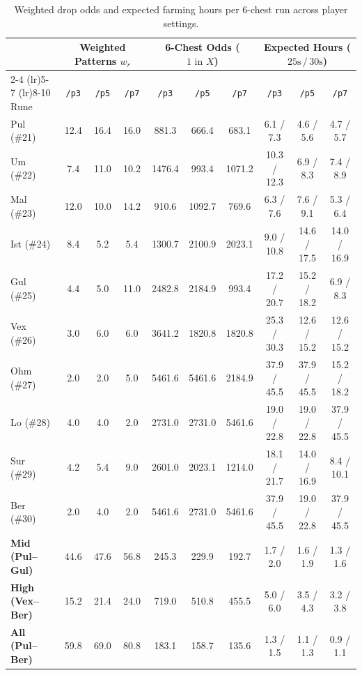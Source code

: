 \documentclass[11pt,reqno]{amsart}
\theoremstyle{definition}
\begin{document}
\begin{table}[htbp]
\centering
\caption{Weighted drop odds and expected farming hours per $6$-chest run across player settings.}
\label{tab:app_odds}
\footnotesize
\setlength{\tabcolsep}{4.2pt}
\begin{tabular}{@{}l ccc ccc ccc@{}}
\toprule
& \multicolumn{3}{c}{\textbf{Weighted Patterns $w_r$}} & \multicolumn{3}{c}{\textbf{6-Chest Odds ($1\text{ in }X$)}} & \multicolumn{3}{c}{\textbf{Expected Hours ($25\text{s} \,/\, 30\text{s}$)}} \\
\cmidrule(lr){2-4} \cmidrule(lr){5-7} \cmidrule(lr){8-10}
Rune & \texttt{/p3} & \texttt{/p5} & \texttt{/p7} & \texttt{/p3} & \texttt{/p5} & \texttt{/p7} & \texttt{/p3} & \texttt{/p5} & \texttt{/p7} \\
\midrule
Pul (\#21) & 12.4 & 16.4 & 16.0 &  881.3 &  666.4 &  683.1 &  6.1 / 7.3 &  4.6 / 5.6 &  4.7 / 5.7 \\
Um (\#22)  &  7.4 & 11.0 & 10.2 & 1476.4 &  993.4 & 1071.2 & 10.3 / 12.3 &  6.9 / 8.3 &  7.4 / 8.9 \\
Mal (\#23) & 12.0 & 10.0 & 14.2 &  910.6 & 1092.7 &  769.6 &  6.3 / 7.6 &  7.6 / 9.1 &  5.3 / 6.4 \\
Ist (\#24) &  8.4 &  5.2 &  5.4 & 1300.7 & 2100.9 & 2023.1 &  9.0 / 10.8 & 14.6 / 17.5 & 14.0 / 16.9 \\
Gul (\#25) &  4.4 &  5.0 & 11.0 & 2482.8 & 2184.9 &  993.4 & 17.2 / 20.7 & 15.2 / 18.2 &  6.9 / 8.3 \\
\midrule
Vex (\#26) &  3.0 &  6.0 &  6.0 & 3641.2 & 1820.8 & 1820.8 & 25.3 / 30.3 & 12.6 / 15.2 & 12.6 / 15.2 \\
Ohm (\#27) &  2.0 &  2.0 &  5.0 & 5461.6 & 5461.6 & 2184.9 & 37.9 / 45.5 & 37.9 / 45.5 & 15.2 / 18.2 \\
Lo (\#28)  &  4.0 &  4.0 &  2.0 & 2731.0 & 2731.0 & 5461.6 & 19.0 / 22.8 & 19.0 / 22.8 & 37.9 / 45.5 \\
Sur (\#29) &  4.2 &  5.4 &  9.0 & 2601.0 & 2023.1 & 1214.0 & 18.1 / 21.7 & 14.0 / 16.9 &  8.4 / 10.1 \\
Ber (\#30) &  2.0 &  4.0 &  2.0 & 5461.6 & 2731.0 & 5461.6 & 37.9 / 45.5 & 19.0 / 22.8 & 37.9 / 45.5 \\
\midrule
\textbf{Mid (Pul--Gul)}  & 44.6 & 47.6 & 56.8 &  245.3 &  229.9 &  192.7 &  1.7 / 2.0 &  1.6 / 1.9 &  1.3 / 1.6 \\
\textbf{High (Vex--Ber)} & 15.2 & 21.4 & 24.0 &  719.0 &  510.8 &  455.5 &  5.0 / 6.0 &  3.5 / 4.3 &  3.2 / 3.8 \\
\textbf{All (Pul--Ber)}  & 59.8 & 69.0 & 80.8 &  183.1 &  158.7 &  135.6 &  1.3 / 1.5 &  1.1 / 1.3 &  0.9 / 1.1 \\
\bottomrule
\end{tabular}
\end{table}
\end{document}
